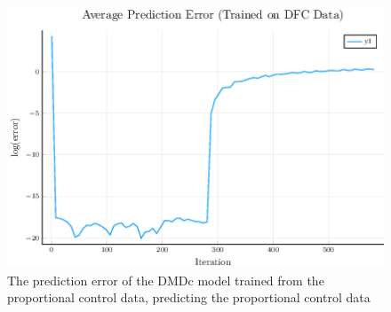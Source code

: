 \documentclass{article}
\begin{document}
\begin{figure}
  \centering
  \includegraphics[scale=0.5]{../images/pred_error_working}
  \caption{The prediction error of the DMDc model trained from the proportional control data, predicting the proportional control data}
  \label{fig:pred_error_working}
\end{figure}
\end{document}
